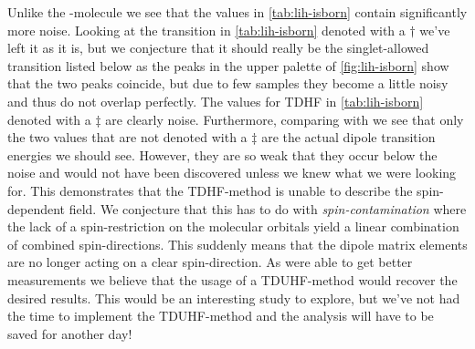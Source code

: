         Unlike the -molecule we see that the values in
        \autoref{tab:lih-isborn} contain significantly more noise.
        Looking at the transition in \autoref{tab:lih-isborn} denoted with a
        $\dagger$ we've left it as it is, but we conjecture that it should
        really be the singlet-allowed transition listed below as the peaks in
        the upper palette of \autoref{fig:lih-isborn} show that the two peaks
        coincide, but due to few samples they become a little noisy and thus do
        not overlap perfectly.
        The values for TDHF in \autoref{tab:lih-isborn} denoted with a
        $\ddagger$ are clearly noise.
        Furthermore, comparing with \citeauthor{isborn} \cite{isborn} we see
        that only the two values that are not denoted with a $\ddagger$ are the
        actual dipole transition energies we should see.
        However, they are so weak that they occur below the noise and would not
        have been discovered unless we knew what we were looking for.
        This demonstrates that the TDHF-method is unable to describe the
        spin-dependent field.
        We conjecture that this has to do with \emph{spin-contamination} where
        the lack of a spin-restriction on the molecular orbitals yield a linear
        combination of combined spin-directions.
        This suddenly means that the dipole matrix elements are no longer acting
        on a clear spin-direction.
        As \citeauthor{isborn} \cite{isborn} were able to get better
        measurements we believe that the usage of a TDUHF-method would recover
        the desired results.
        This would be an interesting study to explore, but we've not had the
        time to implement the TDUHF-method and the analysis will have to be
        saved for another day!


